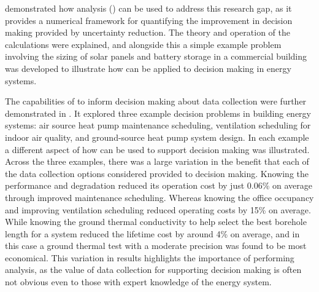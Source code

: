  demonstrated how  analysis () can be used to address this research gap, as it provides a numerical framework for quantifying the improvement in decision making provided by uncertainty reduction. The theory and operation of the  calculations were explained, and alongside this a simple example problem involving the sizing of solar panels and battery storage in a commercial building was developed to illustrate how  can be applied to decision making in energy systems.

The capabilities of  to inform decision making about data collection were further demonstrated in . It explored three example decision problems in building energy systems: air source heat pump maintenance scheduling, ventilation scheduling for indoor air quality, and ground-source heat pump system design. In each example a different aspect of how  can be used to support decision making was illustrated. Across the three examples, there was a large variation in the benefit that each of the data collection options considered provided to decision making. Knowing the  performance and degradation reduced its operation cost by just 0.06\% on average through improved maintenance scheduling. Whereas knowing the office occupancy and improving ventilation scheduling reduced operating costs by 15\% on average. While knowing the ground thermal conductivity to help select the best borehole length for a  system reduced the lifetime cost by around 4\% on average, and in this case a ground thermal test with a moderate precision was found to be most economical. This variation in  results highlights the importance of performing  analysis, as the value of data collection for supporting decision making is often not obvious even to those with expert knowledge of the energy system.

